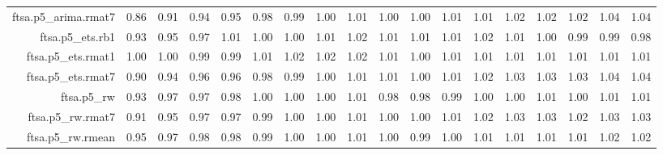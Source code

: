 \begin{tabular}{rrrrrrrrrrrrrrrrrr}
  ftsa.p5\_arima.rmat7 & 0.86 & 0.91 & 0.94 & 0.95 & 0.98 & 0.99 & 1.00 & 1.01 & 1.00 & 1.00 & 1.01 & 1.01 & 1.02 & 1.02 & 1.02 & 1.04 & 1.04 \\ 
  ftsa.p5\_ets.rb1 & 0.93 & 0.95 & 0.97 & 1.01 & 1.00 & 1.00 & 1.01 & 1.02 & 1.01 & 1.01 & 1.01 & 1.02 & 1.01 & 1.00 & 0.99 & 0.99 & 0.98 \\ 
  ftsa.p5\_ets.rmat1 & 1.00 & 1.00 & 0.99 & 0.99 & 1.01 & 1.02 & 1.02 & 1.02 & 1.01 & 1.00 & 1.01 & 1.01 & 1.01 & 1.01 & 1.01 & 1.01 & 1.01 \\ 
  ftsa.p5\_ets.rmat7 & 0.90 & 0.94 & 0.96 & 0.96 & 0.98 & 0.99 & 1.00 & 1.01 & 1.01 & 1.00 & 1.01 & 1.02 & 1.03 & 1.03 & 1.03 & 1.04 & 1.04 \\ 
  ftsa.p5\_rw & 0.93 & 0.97 & 0.97 & 0.98 & 1.00 & 1.00 & 1.00 & 1.01 & 0.98 & 0.98 & 0.99 & 1.00 & 1.00 & 1.01 & 1.00 & 1.01 & 1.01 \\ 
  ftsa.p5\_rw.rmat7 & 0.91 & 0.95 & 0.97 & 0.97 & 0.99 & 1.00 & 1.00 & 1.01 & 1.00 & 1.00 & 1.01 & 1.02 & 1.03 & 1.03 & 1.02 & 1.03 & 1.03 \\ 
  ftsa.p5\_rw.rmean & 0.95 & 0.97 & 0.98 & 0.98 & 0.99 & 1.00 & 1.00 & 1.01 & 1.00 & 0.99 & 1.00 & 1.01 & 1.01 & 1.01 & 1.01 & 1.02 & 1.02 \\ 
   \hline
\end{tabular}
